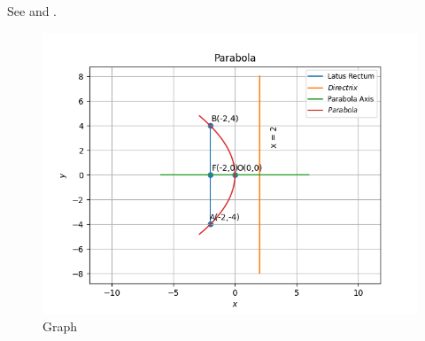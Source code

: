 See  and 
.
\begin{figure}[ht]
\centering
\includegraphics[width = \columnwidth]{chapters/11/11/2/3/figs/fig.png}
\caption{Graph}
\label{fig:chapters/11/11/2/3/1}
\end{figure}
